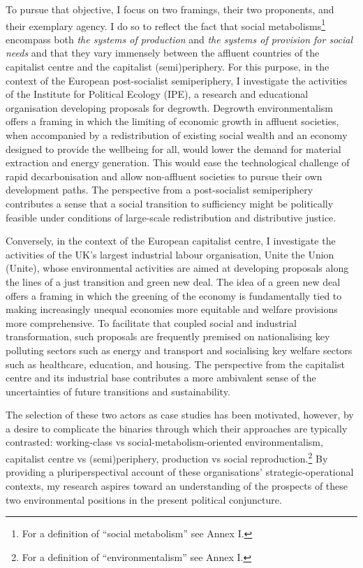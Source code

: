 \documentclass[a4paper, nobind]{templates/ociamthesis}
\begin{document}
To pursue that objective, I focus on two framings, their two proponents, and their exemplary agency. I do so to reflect the fact that social metabolisms\footnote{For a definition of ``social metabolism'' see Annex I.} encompass both \emph{the systems of production} and \emph{the systems of provision for social needs} and that they vary immensely between the affluent countries of the capitalist centre and the capitalist (semi)periphery. For this purpose, in the context of the European post-socialist semiperiphery, I investigate the activities of the Institute for Political Ecology (IPE), a research and educational organisation developing proposals for degrowth. Degrowth environmentalism offers a framing in which the limiting of economic growth in affluent societies, when accompanied by a redistribution of existing social wealth and an economy designed to provide the wellbeing for all, would lower the demand for material extraction and energy generation. This would ease the technological challenge of rapid decarbonisation and allow non-affluent societies to pursue their own development paths. The perspective from a post-socialist semiperiphery contributes a sense that a social transition to sufficiency might be politically feasible under conditions of large-scale redistribution and distributive justice.

Conversely, in the context of the European capitalist centre, I investigate the activities of the UK's largest industrial labour organisation, Unite the Union (Unite), whose environmental activities are aimed at developing proposals along the lines of a just transition and green new deal. The idea of a green new deal offers a framing in which the greening of the economy is fundamentally tied to making increasingly unequal economies more equitable and welfare provisions more comprehensive. To facilitate that coupled social and industrial transformation, such proposals are frequently premised on nationalising key polluting sectors such as energy and transport and socialising key welfare sectors such as healthcare, education, and housing. The perspective from the capitalist centre and its industrial base contributes a more ambivalent sense of the uncertainties of future transitions and sustainability.

The selection of these two actors as case studies has been motivated, however, by a desire to complicate the binaries through which their approaches are typically contrasted: working-class vs social-metabolism-oriented environmentalism, capitalist centre vs (semi)periphery, production vs social reproduction.\footnote{For a definition of ``environmentalism'' see Annex I.} By providing a pluriperspectival account of these organisations' strategic-operational contexts, my research aspires toward an understanding of the prospects of these two environmental positions in the present political conjuncture.
\end{document}
